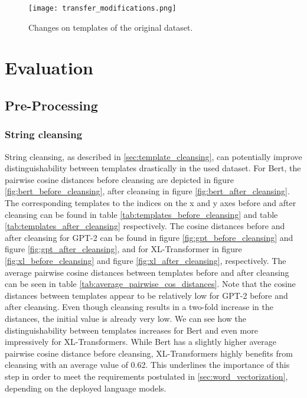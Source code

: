 \begin{figure}[H]
  \centering
  \texttt{[image: transfer\_modifications.png]}\\
  \caption{Changes on templates of the original dataset.}
  \label{fig:transfer_modifications}
\end{figure}




\section{Evaluation}
\subsection{Pre-Processing}
\subsubsection{String cleansing}
String cleansing, as described in \ref{sec:template_cleansing}, can potentially  improve distinguishability between templates drastically in the used dataset.
For Bert, the pairwise cosine distances before cleansing are depicted in figure \ref{fig:bert_before_cleansing}, after cleansing in figure \ref{fig:bert_after_cleansing}. The corresponding templates to the indices on the x and y axes before and after cleansing can be found in table \ref{tab:templates_before_cleansing} and table \ref{tab:templates_after_cleansing} respectively.
The cosine distances before and after cleansing for GPT-2 can be found in figure \ref{fig:gpt_before_cleansing} and figure \ref{fig:gpt_after_cleansing}, and for XL-Transformer in figure \ref{fig:xl_before_cleansing} and figure \ref{fig:xl_after_cleansing}, respectively. The average pairwise cosine distances between templates before and after cleansing can be seen in table \ref{tab:average_pairwise_cos_distances}.
Note that the cosine distances between templates appear to be relatively low for GPT-2 before and after cleansing. Even though cleansing results in a two-fold increase in the distances, the initial value is already very low. We can see how the distinguishability between templates increases for Bert and even more impressively for XL-Transformers. While Bert has a slightly higher average pairwise cosine distance before cleansing, XL-Transformers highly benefits from cleansing with an average value of 0.62. This underlines the importance of this step in order to meet the requirements postulated in \ref{sec:word_vectorization}, depending on the deployed language models.



